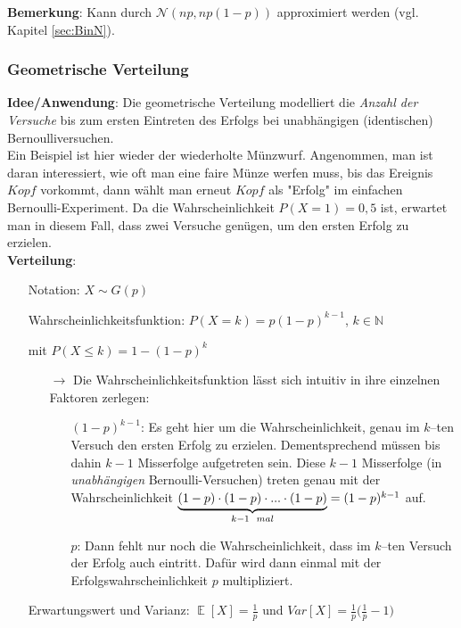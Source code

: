 \documentclass[a4paper]{article}
\DeclareMathOperator*{\E}{\mathbb{E}}
\begin{document}
\noindent \textbf{Bemerkung}: Kann durch $\mathcal{N}(np,np(1-p))$ approximiert werden (vgl. Kapitel \ref{sec:BinN}).

\subsubsection{Geometrische Verteilung} \label{sec:Geo}

\noindent \textbf{Idee/Anwendung}: Die geometrische Verteilung modelliert die \textit{Anzahl der Versuche} bis zum ersten Eintreten des Erfolgs bei unabhängigen (identischen) Bernoulliversuchen. \\

\noindent Ein Beispiel ist hier wieder der wiederholte Münzwurf. Angenommen, man ist daran interessiert, wie oft man eine faire Münze werfen muss, bis das Ereignis $Kopf$ vorkommt, dann wählt man erneut $Kopf$ als "Erfolg" im einfachen Bernoulli-Experiment. Da die Wahrscheinlichkeit $P(X=1)=0,5$ ist, erwartet man in diesem Fall, dass zwei Versuche genügen, um den ersten Erfolg zu erzielen. \\

\noindent \textbf{Verteilung}:
\begin{itemize}
\item[] Notation: $X\sim G(p)$
\item[] Wahrscheinlichkeitsfunktion: $P(X=k)=p(1-p)^{k-1}$, $k \in \mathbb{N}$
\item[] \hspace{4.5cm} mit $P(X \leq k)=1-(1-p)^k$
	\begin{itemize}
	\item[$\rightarrow$] Die Wahrscheinlichkeitsfunktion lässt sich intuitiv in ihre einzelnen Faktoren zerlegen:
		\begin{itemize}
		\item[] $(1-p)^{k-1}$: Es geht hier um die Wahrscheinlichkeit, genau im $k$--ten Versuch den ersten Erfolg zu erzielen. Dementsprechend müssen bis dahin $k-1$ Misserfolge aufgetreten sein. Diese $k-1$ Misserfolge (in \textit{unabhängigen} Bernoulli-Versuchen) treten genau mit der Wahrscheinlichkeit $\underbrace{(1-p)\cdot(1-p)\cdot ... \cdot (1-p)}_{k-1 \hspace{0.2cm} mal} = (1-p)^{k-1}$ auf.
		\item[] $p$: Dann fehlt nur noch die Wahrscheinlichkeit, dass im $k$--ten Versuch der Erfolg auch eintritt. Dafür wird dann einmal mit der Erfolgswahrscheinlichkeit $p$ multipliziert.
		\end{itemize}
	\end{itemize}
\item[] Erwartungswert und Varianz: $\E[X]=\frac{1}{p}$ und $Var[X]=\frac{1}{p}\Big(\frac{1}{p}-1\Big)$

\end{itemize}
\end{document}
